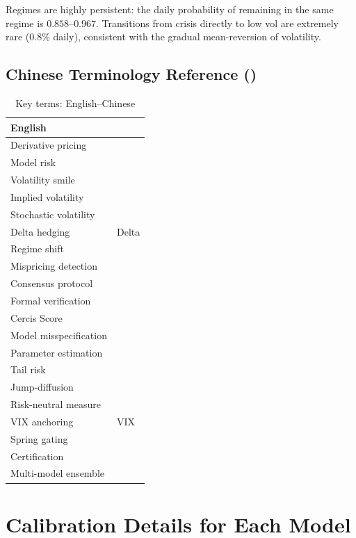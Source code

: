 \documentclass[11pt,a4paper]{article}
\theoremstyle{plain}
\theoremstyle{definition}
\theoremstyle{remark}
\begin{document}
Regimes are highly persistent: the daily probability of remaining in the same regime is $0.858$--$0.967$. Transitions from crisis directly to low vol are extremely rare ($0.8\%$ daily), consistent with the gradual mean-reversion of volatility.

\subsection{Chinese Terminology Reference ()}

\begin{table}[H]
\centering
\caption{Key terms: English--Chinese}
\label{tab:chinese_terms}
\begin{tabular}{ll}
\toprule
English &  \\
\midrule
Derivative pricing        &  \\
Model risk                &  \\
Volatility smile          &  \\
Implied volatility        &  \\
Stochastic volatility     &  \\
Delta hedging             & Delta \\
Regime shift              &  \\
Mispricing detection      &  \\
Consensus protocol        &  \\
Formal verification       &  \\
Cercis Score              &  \\
Model misspecification    &  \\
Parameter estimation      &  \\
Tail risk                 &  \\
Jump-diffusion            &  \\
Risk-neutral measure      &  \\
VIX anchoring             & VIX \\
Spring gating             &  \\
Certification             &  \\
Multi-model ensemble      &  \\
\bottomrule
\end{tabular}
\end{table}

\section{Calibration Details for Each Model}
\end{document}
